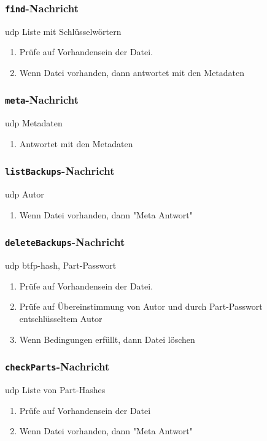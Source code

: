 \subsubsection{\texttt{find}-Nachricht}
\label{sec:dateianfrage}
{\gls{udp}}
{Liste mit Schlüsselwörtern}
{\begin{enumerate}
	\item Prüfe auf Vorhandensein der Datei.
	\item Wenn Datei vorhanden, dann antwortet mit den Metadaten
\end{enumerate}}


\subsubsection{\texttt{meta}-Nachricht}
\label{sec:metaantwort}
{\gls{udp}}
{Metadaten}
{\begin{enumerate}
	\item Antwortet mit den Metadaten
\end{enumerate}}


\subsubsection{\texttt{listBackups}-Nachricht}
\label{sec:backupanfrage}
{\gls{udp}}
{Autor}
{\begin{enumerate}
	\item Wenn Datei vorhanden, dann "Meta Antwort"
\end{enumerate}}

\subsubsection{\texttt{deleteBackups}-Nachricht}
\label{sec:backuploeschen}
{\gls{udp}}
{\gls{btfp}-\gls{hash}, \gls{Part-Passwort}}
{\begin{enumerate}
	\item Prüfe auf Vorhandensein der Datei.
	\item Prüfe auf Übereinstimmung von Autor und durch \gls{Part-Passwort} entschlüsseltem Autor
	\item Wenn Bedingungen erfüllt, dann Datei löschen
\end{enumerate}}

\subsubsection{\texttt{checkParts}-Nachricht}
\label{sec:redundanzpruefen}
{\gls{udp}}
{Liste von Part-Hashes}
{\begin{enumerate}
	\item Prüfe auf Vorhandensein der Datei
	\item Wenn Datei vorhanden, dann "Meta Antwort"
\end{enumerate}}

